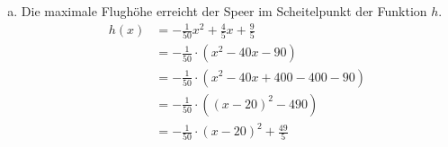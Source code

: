 \begin{exercise}
\begin{enumerate}[a)]
\begin{alignat*}{3}
                \noeq
                &
                p&=-\num{40}
                &
                \nomod
                \\
                \noeq
                &
                q&=-\num{90}
                &
                \nomod
                \\
                \noeq
                &
                x_{1,2}&=-\frac{p}{2}\pm\sqrt{\left(\frac{p}{2}\right)^2-q}
                &
                \nomod
                \\
                \noeq
                &
                &=\num{20}\pm\sqrt{\left(-\num{20}\right)^2-\left(-\num{90}\right)}
                &
                \nomod
                \\
                \noeq
                &
                &=\num{20}\pm\sqrt{\num{490}}
                &
                \nomod
                \\
                \noeq
                &
                x_1&\approx-\num{2.135944}
                &
                \nomod
                \\
                \noeq
                &
                x_2&\approx\num{42.135944}
                &
                \nomod
              \end{alignat*}
            \endgroup
            Der Speer fliegt also erwa \SI{42.14}{\metre} weit.
      \item Die maximale Flughöhe erreicht der Speer
            im Scheitelpunkt der Funktion $h$.
            \begin{equation*}
              \begin{split}
                h(x)&=-\frac{\num{1}}{\num{50}}x^{2}+\frac{\num{4}}{\num{5}}x+\frac{\num{9}}{\num{5}}
                \\
                &=-\frac{\num{1}}{\num{50}}\cdot\left(x^{2}-\num{40}x-\num{90}\right)
                \\
                &=-\frac{\num{1}}{\num{50}}\cdot\left(x^{2}-\num{40}x+\num{400}-\num{400}-\num{90}\right)
                \\
                &=-\frac{\num{1}}{\num{50}}\cdot\left(\left(x-20\right)^{2}-\num{490}\right)
                \\
                &=-\frac{\num{1}}{\num{50}}\cdot\left(x-20\right)^{2}+\frac{\num{49}}{\num{5}}

\end{split}
\end{equation*}
\end{enumerate}
\end{exercise}
